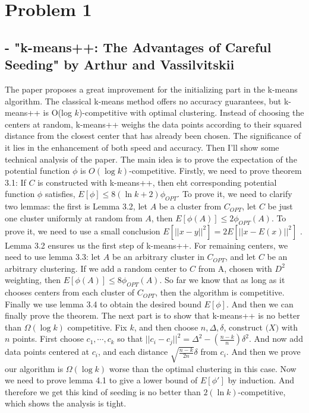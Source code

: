 \documentclass[twoside,11pt]{homework}
\date{Oct 5 2018} %
\begin{document}
\maketitle

\section*{Problem 1}

\subsection*{- "k-means++: The Advantages of Careful Seeding" by Arthur and Vassilvitskii}

The paper proposes a great improvement for the initializing part in the k-means algorithm. The classical k-means method offers no accuracy guarantees, but k-means++ is O(log $k$)-competitive with optimal clustering. Instead of choosing the centers at random, k-means++ weighs the data points according to their squared distance from the closest center that has already been chosen. The significance of it lies in the enhancement of both speed and accuracy.
\newline
Then I'll show some technical analysis of the paper. The main idea is to prove the expectation of the potential function $\phi$ is $O(\log k)$-competitive. Firstly, we need to prove theorem 3.1: If $C$ is constructed with k-means++, then eht corresponding potential function $\phi$ satisfies, $E[\phi] \leq 8(\ln k+2)\phi_{OPT}$. To prove it, we need to clarify two lemmas: the first is Lemma 3.2, let $A$ be a cluster from $C_{OPT}$, let $C$ be just one cluster uniformly at random from $A$, then $E[\phi(A)] \leq 2\phi_{OPT}(A)$. To prove it, we need to use a small conclusion $E[||x-y||^2] = 2E[||x-E(x)||^2]$ . Lemma 3.2 ensures us the first step of k-means++. For remaining centers, we need to use lemma 3.3: let $A$ be an arbitrary cluster in $C_{OPT}$, and let $C$ be an arbitrary clustering. If we add a random center to $C$ from A, chosen with $D^2$ weighting, then $E[\phi(A)] \leq 8\phi_{OPT}(A)$. So far we know that as long as it chooses centers from each cluster of $C_{OPT}$, then the algorithm is competitive. Finally we use lemma 3.4 to obtain the desired bound $E[\phi]$. And then we can finally prove the theorem.
\newline
The next part is to show that k-means++ is no better than $\Omega(\log k)$ competitive. Fix $k$, and then choose $n, \Delta, \delta$, construct $\mathcal(X)$ with $n$ points. First choose ${c_1, \cdots,c_k}$ so that $||c_i-c_j||^2=\Delta ^2 - (\frac{n-k}{n})\delta ^2$. And now add data points centered at $c_i$, and each distance $\sqrt{\frac{n-k}{2n}}\delta$ from $c_i$. And then we prove our algorithm is $\Omega(\log k)$ worse than the optimal clustering in this case. Now we need to prove lemma 4.1 to give a lower bound of $E[\phi']$ by induction. And therefore we get this kind of seeding is no better than $2(\ln k)$-competitive, which shows the analysis is tight.
\end{document}
